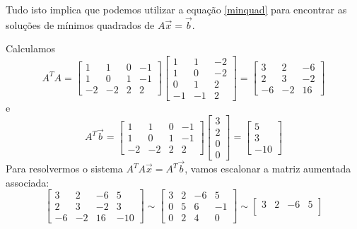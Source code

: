 \documentclass[../livro.tex]{subfiles}  %
\begin{document}
Tudo isto implica que podemos utilizar a equação \eqref{minquad} para encontrar as soluções de mínimos quadrados de $A \vec{x} = \vec{b}$. 

\begin{example}\label{exp:minquad2}
  Calculamos
  \[
  A^T A =
  \begin{bmatrix}
    1 & 1 & 0 & -1 \\ 1 & 0 & 1 & -1 \\ -2 & -2 & 2 & 2
  \end{bmatrix}
  \begin{bmatrix}
    1 & 1 & -2 \\ 1 & 0 & -2 \\ 0 & 1 & 2 \\ -1 & -1 & 2
  \end{bmatrix} =
  \begin{bmatrix}
    3 & 2 & -6 \\ 2 & 3 & -2 \\ -6 & -2 & 16
  \end{bmatrix}
  \] e
  \[
  A^T \vec{b} =
  \begin{bmatrix}
    1 & 1 & 0 & -1 \\ 1 & 0 & 1 & -1 \\ -2 & -2 & 2 & 2
  \end{bmatrix}
  \begin{bmatrix}
    3 \\ 2 \\ 0 \\ 0
  \end{bmatrix} =
  \begin{bmatrix}
    5 \\ 3 \\ -10
  \end{bmatrix}
  \] Para resolvermos o sistema $A^TA\vec{x} = A^T\vec{b}$, vamos escalonar a matriz aumentada associada:
  \[
  \begin{bmatrix}
    3 & 2 & -6 & 5 \\
    2 & 3 & -2 & 3 \\
    -6 & -2 & 16 & -10
  \end{bmatrix} \sim
  \begin{bmatrix}
    3 & 2 & -6 & 5 \\
    0 & 5 &  6 & -1 \\
    0 & 2 &  4 & 0
  \end{bmatrix} \sim
  \begin{bmatrix}
    3 & 2 & -6 & 5 \\

\end{bmatrix}\]
\end{example}
\end{document}
